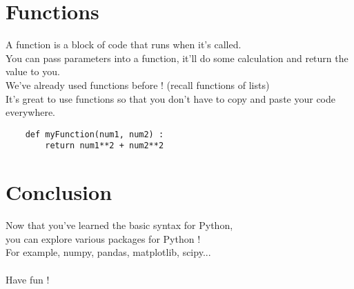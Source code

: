 \documentclass[12pt]{article}
\begin{document}
\begin{CJK*}{UTF8}{bkai}
\section{Functions}
A function is a block of code that runs when it's called.\\
You can pass parameters into a function, it'll do some calculation and return the value to you.\\
We've already used functions before ! (recall functions of lists)\\
It's great to use functions so that you don't have to copy and paste your code everywhere.

\begin{verbatim}
    def myFunction(num1, num2) :
        return num1**2 + num2**2
\end{verbatim}

\section{Conclusion}
Now that you've learned the basic syntax for Python, \\
you can explore various packages for Python ! \\
For example, numpy, pandas, matplotlib, scipy... \\\\
Have fun !


\end{CJK*}
\end{document}
